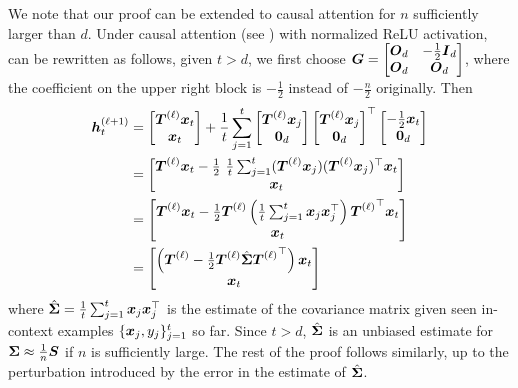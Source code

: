 {
\begin{remark}
\label{rmk:causal}
We note that our proof can be extended to causal attention for $n$ sufficiently larger than $d$. Under causal attention (see ) with normalized ReLU activation,  can be rewritten as follows, given $t > d$, we first choose $\boldsymbol{G} = \begin{bmatrix}
        \boldsymbol{O}_d & -\frac{1}{2} \boldsymbol{I}_d \\
        \boldsymbol{O}_d & \boldsymbol{O}_d 
    \end{bmatrix}$, where the coefficient on the upper right block is $-\frac{1}{2}$ instead of $-\frac{n}{2}$ originally. Then
\begin{equation}
    \begin{aligned}
        \boldsymbol{h}_t^{(\ell+1)} &= \begin{bmatrix}
        \boldsymbol{T}^{(\ell)} \boldsymbol{x}_t \\ \boldsymbol{x}_t 
    \end{bmatrix} + \frac{1}{t} \sum_{j=1}^t \begin{bmatrix}
        \boldsymbol{T}^{(\ell)} \boldsymbol{x}_j \\ \boldsymbol{0}_d 
    \end{bmatrix} \begin{bmatrix}
        \boldsymbol{T}^{(\ell)} \boldsymbol{x}_j \\ \boldsymbol{0}_d 
    \end{bmatrix}^\top  \begin{bmatrix}
         -\frac{1}{2} \boldsymbol{x}_t \\ \boldsymbol{0}_d 
    \end{bmatrix} \\
    &= \begin{bmatrix}
        \boldsymbol{T}^{(\ell)} \boldsymbol{x}_t - \frac{1}{2}~ \frac{1}{t}\sum_{j=1}^t  (\boldsymbol{T}^{(\ell)} \boldsymbol{x}_j) (\boldsymbol{T}^{(\ell)} \boldsymbol{x}_j)^\top  \boldsymbol{x}_t \\ \boldsymbol{x}_t  
    \end{bmatrix} \\
    &= \begin{bmatrix}
        \boldsymbol{T}^{(\ell)} \boldsymbol{x}_t - \frac{1}{2} \boldsymbol{T}^{(\ell)} \left(\frac{1}{t}\sum_{j=1}^t \boldsymbol{x}_j  \boldsymbol{x}_j^\top\right)  {\boldsymbol{T}^{(\ell)}}^\top \boldsymbol{x}_t \\ \boldsymbol{x}_t  
    \end{bmatrix} \\
    &= \begin{bmatrix}
        \left(\boldsymbol{T}^{(\ell)} - \frac{1}{2} \boldsymbol{T}^{(\ell)} \hat{\boldsymbol{\Sigma}} {\boldsymbol{T}^{(\ell)}}^\top \right) \boldsymbol{x}_t \\ \boldsymbol{x}_t 
    \end{bmatrix}
    \end{aligned}
\end{equation}
where $\hat{\boldsymbol{\Sigma}} = \frac{1}{t}\sum_{j=1}^t \boldsymbol{x}_j  \boldsymbol{x}_j^\top$ is the estimate of the covariance matrix given seen in-context examples $\{\boldsymbol{x}_j, y_j\}_{j=1}^t$ so far. Since $t > d$, $\hat{\boldsymbol{\Sigma}}$ is an unbiased estimate for $\boldsymbol{\Sigma} \approx \frac{1}{n} \boldsymbol{S}$ if $n$ is sufficiently large. The rest of the proof follows similarly, up to the perturbation introduced by the error in the estimate of $\hat{\boldsymbol{\Sigma}}$. 


\end{remark}}

